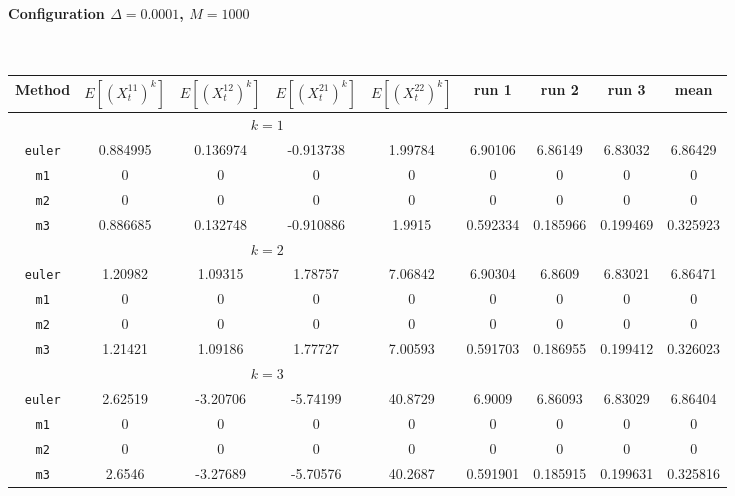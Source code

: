 \paragraph*{Configuration $\Delta=0.0001$, $M=1000$}\hfill\\
\begin{tabular}{@{}*{9}{c}@{}}
Method & $E[(X^{11}_t)^k]$ & $E[(X^{12}_t)^k]$ & $E[(X^{21}_t)^k]$ & $E[(X^{22}_t)^k]$ & run 1 & run 2 & run 3 & mean\\
\hline
\multicolumn{6}{c}{$k=1$}\\
\verb+euler+ & 0.884995 & 0.136974 & -0.913738 & 1.99784 & 6.90106 & 6.86149 & 6.83032 & 6.86429 \\
 \verb+m1+ & 0 & 0 & 0 & 0 & 0 & 0 & 0 & 0 \\
 \verb+m2+ & 0 & 0 & 0 & 0 & 0 & 0 & 0 & 0 \\
 \verb+m3+ & 0.886685 & 0.132748 & -0.910886 & 1.9915 & 0.592334 & 0.185966 & 0.199469 & 0.325923 \\
\hline
\multicolumn{6}{c}{$k=2$}\\
\verb+euler+ & 1.20982 & 1.09315 & 1.78757 & 7.06842 & 6.90304 & 6.8609 & 6.83021 & 6.86471 \\
 \verb+m1+ & 0 & 0 & 0 & 0 & 0 & 0 & 0 & 0 \\
 \verb+m2+ & 0 & 0 & 0 & 0 & 0 & 0 & 0 & 0 \\
 \verb+m3+ & 1.21421 & 1.09186 & 1.77727 & 7.00593 & 0.591703 & 0.186955 & 0.199412 & 0.326023 \\
\hline
\multicolumn{6}{c}{$k=3$}\\
\verb+euler+ & 2.62519 & -3.20706 & -5.74199 & 40.8729 & 6.9009 & 6.86093 & 6.83029 & 6.86404 \\
 \verb+m1+ & 0 & 0 & 0 & 0 & 0 & 0 & 0 & 0 \\
 \verb+m2+ & 0 & 0 & 0 & 0 & 0 & 0 & 0 & 0 \\
 \verb+m3+ & 2.6546 & -3.27689 & -5.70576 & 40.2687 & 0.591901 & 0.185915 & 0.199631 & 0.325816 
\end{tabular}\hfill\\
